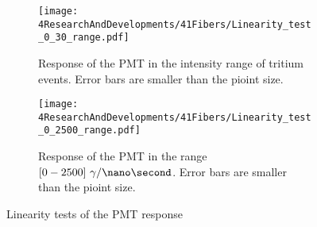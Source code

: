 \begin{figure}
\centering
    \begin{subfigure}[b]{0.8\textwidth}
    \centering
    \texttt{[image: 4ResearchAndDevelopments/41Fibers/Linearity\_test\_0\_30\_range.pdf]}  
    \caption{Response of the PMT in the intensity range of tritium events. Error bars are smaller than the pioint size. \label{subfig:LinearityTritiumRange}}
    \end{subfigure}
    \hfill
    \begin{subfigure}[b]{0.8\textwidth}
    \centering
    \texttt{[image: 4ResearchAndDevelopments/41Fibers/Linearity\_test\_0\_2500\_range.pdf]}  
    \caption{Response of the PMT in the range $[0-2500]~\gamma/\nano\second$. Error bars are smaller than the pioint size. \label{subfig:LinearityStudyRange}}
    \end{subfigure}
 \caption{Linearity tests of the PMT response}
 \label{fig:LinearityRangesOfPMT}
\end{figure}